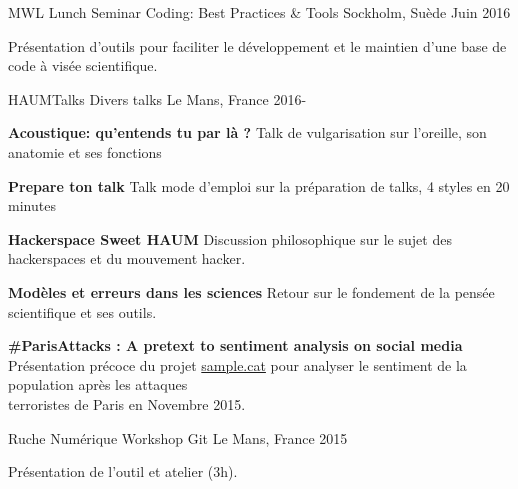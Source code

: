 

\begin{cventries}

  \cventry
    {MWL Lunch Seminar} %
		{Coding: Best Practices \& Tools} %
    {Sockholm, Suède} %
    {Juin 2016} %
    {
      \begin{cvitems} %
        \item {Présentation d'outils pour faciliter le développement et le maintien d'une
					base de code à visée scientifique.}
      \end{cvitems}
    }

  \cventry
		{HAUMTalks} %
		{Divers talks} %
    {Le Mans, France} %
    {2016-} %
    {
      \begin{cvitems} %
			\item {\textbf{Acoustique: qu'entends tu par là ?} Talk de vulgarisation sur
				l'oreille, son anatomie et ses fonctions}
			\item {\textbf{Prepare ton talk} Talk mode d'emploi sur la préparation de talks, 4
				styles en 20 minutes}
			\item {\textbf{Hackerspace Sweet HAUM} Discussion philosophique sur le sujet des
				hackerspaces et du mouvement hacker.}
			\item {\textbf{Modèles et erreurs dans les sciences} Retour sur le fondement de la pensée scientifique et ses outils.}
			\item {\textbf{\#ParisAttacks : A pretext to sentiment analysis on social
				media}\\Présentation précoce du projet \href{https://sample.cat}{sample.cat} pour
				analyser le sentiment de la population après les attaques\\ terroristes de Paris en
				Novembre 2015.}
      \end{cvitems}
    }

  \cventry
    {Ruche Numérique} %
    {Workshop Git} %
    {Le Mans, France} %
    {2015} %
    {
      \begin{cvitems} %
			\item {Présentation de l'outil et atelier (3h).}
      \end{cvitems}
    }


\end{cventries}
